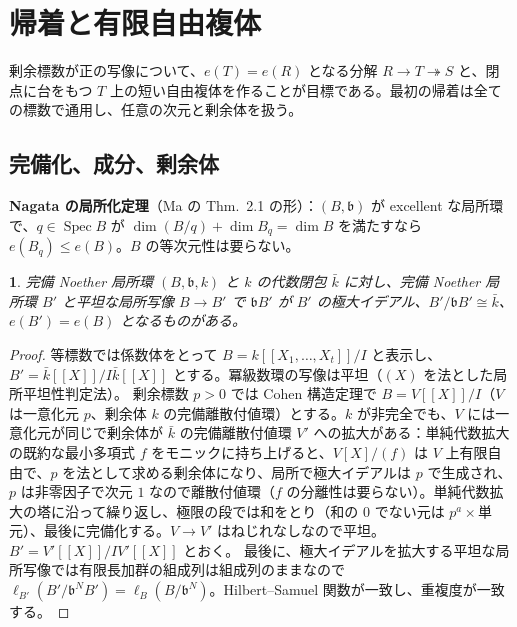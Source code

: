 \documentclass[11pt,a4paper]{ltjsarticle}
\newcommand{\stmtname}{}
\theoremstyle{plain}
\newtheorem*{stmtgen}{\stmtname}
\newenvironment{stmt}[1]{\renewcommand{\stmtname}{#1}\begin{stmtgen}}{\end{stmtgen}}
\theoremstyle{definition}
\newcommand{\bb}{\mathfrak{b}}
\newcommand{\Spec}{\operatorname{Spec}}
\begin{document}
\section{帰着と有限自由複体}\label{sec:reduction}

剰余標数が正の写像について、$e(T) = e(R)$ となる分解 $R\to T\twoheadrightarrow S$ と、閉点に台をもつ $T$ 上の短い自由複体を作ることが目標である。最初の帰着は全ての標数で通用し、任意の次元と剰余体を扱う。

\subsection{完備化、成分、剰余体}
\textbf{Nagata の局所化定理}（Ma の Thm.~2.1 の形）：$(B,\bb)$ が excellent な局所環で、$q\in\Spec B$ が $\dim(B/q)+\dim B_q = \dim B$ を満たすなら $e(B_q)\le e(B)$。$B$ の等次元性は要らない。

\begin{stmt}{補題 4.1}
完備 Noether 局所環 $(B,\bb,k)$ と $k$ の代数閉包 $\bar k$ に対し、完備 Noether 局所環 $B'$ と平坦な局所写像 $B\to B'$ で
$\bb B'$ が $B'$ の極大イデアル、$B'/\bb B'\cong\bar k$、$e(B') = e(B)$
となるものがある。
\end{stmt}
\begin{proof}
等標数では係数体をとって $B = k[[X_1,\dots,X_t]]/I$ と表示し、$B' = \bar k[[X]]/I\bar k[[X]]$ とする。冪級数環の写像は平坦（$(X)$ を法とした局所平坦性判定法）。
剰余標数 $p>0$ では Cohen 構造定理で $B = V[[X]]/I$（$V$ は一意化元 $p$、剰余体 $k$ の完備離散付値環）とする。$k$ が非完全でも、$V$ には一意化元が同じで剰余体が $\bar k$ の完備離散付値環 $V'$ への拡大がある：単純代数拡大の既約な最小多項式 $f$ をモニックに持ち上げると、$V[X]/(f)$ は $V$ 上有限自由で、$p$ を法として求める剰余体になり、局所で極大イデアルは $p$ で生成され、$p$ は非零因子で次元 $1$ なので離散付値環（$f$ の分離性は要らない）。単純代数拡大の塔に沿って繰り返し、極限の段では和をとり（和の $0$ でない元は $p^a\times$単元）、最後に完備化する。$V\to V'$ はねじれなしなので平坦。$B' = V'[[X]]/IV'[[X]]$ とおく。
最後に、極大イデアルを拡大する平坦な局所写像では有限長加群の組成列は組成列のままなので $\ell_{B'}(B'/\bb^NB') = \ell_B(B/\bb^N)$。Hilbert--Samuel 関数が一致し、重複度が一致する。
\end{proof}
\end{document}
